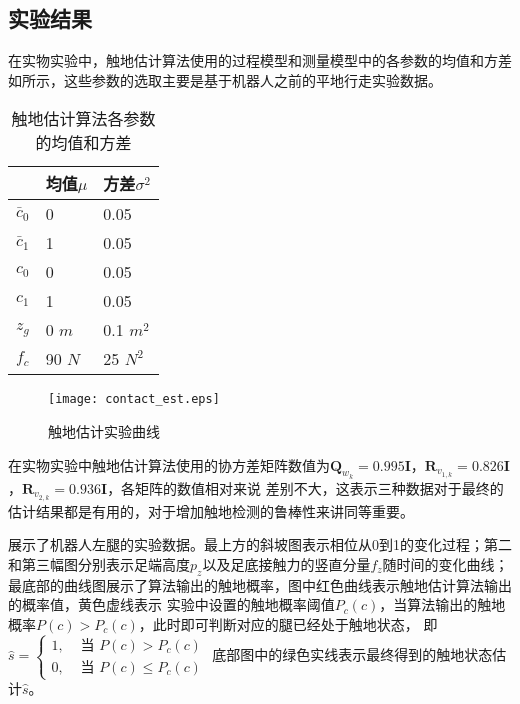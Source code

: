 \subsection{实验结果}
在实物实验中，触地估计算法使用的过程模型和测量模型中的各参数的均值和方差如所示，这些参数的选取主要是基于机器人之前的平地行走实验数据。
\begin{table}[htbp]
	\centering
	\caption{触地估计算法各参数的均值和方差}
	\label{tab:contact_para}
	\begin{tabular}{m{2cm}<{\centering}m{3cm}<{\centering}m{3cm}<{\centering}}
		\toprule  %
		\fangsong{参数名称}   & 均值$\mu$ & 方差$\sigma^2$  \\
		\midrule  %
		$\bar{c}_0$    & 0 & 0.05\\
		$\bar{c}_1$ & 1 & 0.05 \\
		${c}_0$ & 0 & 0.05 \\
        ${c}_1$ & 1 & 0.05 \\
        ${z}_g$ & 0 $m$ & 0.1 $m^2$ \\
        ${f}_c$ & 90 $N$ & 25 $N^2$ \\
		\bottomrule %
	\end{tabular}
\end{table}
\begin{figure}[h]
    \centering
    \texttt{[image: contact\_est.eps]}
    \caption{\label{fig:contact_est}触地估计实验曲线}
\end{figure}
在实物实验中触地估计算法使用的协方差矩阵数值为$\boldsymbol{Q}_{w_k}=0.995\mathbf{I}$，$\boldsymbol{R}_{v_{1,k}}=0.826 \mathbf{I}$，$\boldsymbol{R}_{v_{2,k}}=0.936 \mathbf{I}$，各矩阵的数值相对来说
差别不大，这表示三种数据对于最终的估计结果都是有用的，对于增加触地检测的鲁棒性来讲同等重要。

展示了机器人左腿的实验数据。最上方的斜坡图表示相位从0到1的变化过程；第二和第三幅图分别表示足端高度$p_z$以及足底接触力的竖直分量$f_z$随时间的变化曲线；
最底部的曲线图展示了算法输出的触地概率，图中红色曲线表示触地估计算法输出的概率值，黄色虚线表示
实验中设置的触地概率阈值$P_{c}(c)$，当算法输出的触地概率$P(c)>P_{c}(c)$，此时即可判断对应的腿已经处于触地状态，
即$\hat{s}= \begin{cases}1, & \text { 当 } P(c)>P_c(c) \\ 0, & \text { 当 } P(c) \leq P_c(c)\end{cases}$
底部图中的绿色实线表示最终得到的触地状态估计$\hat{s}$。

